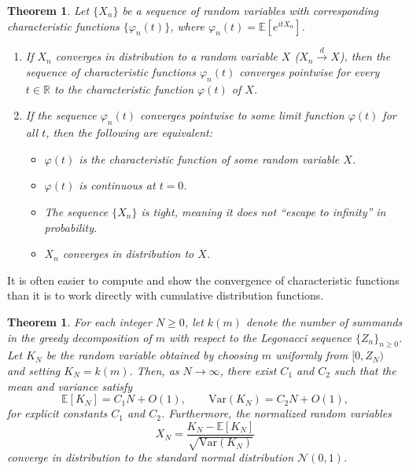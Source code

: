 \documentclass[11pt]{amsart}
\theoremstyle{plain}
\numberwithin{equation}{section} %
\newtheorem{theorem}[thm]{Theorem}
\numberwithin{table}{section} %
\numberwithin{figure}{section}
\begin{document}
	\begin{theorem}
		\label{Levy:theorem}
		Let $\{X_n\}$ be a sequence of random variables with corresponding characteristic functions $\{\varphi_n(t)\}$, where $\varphi_n(t) = \mathbb{E}[e^{itX_n}]$.
		
		\begin{enumerate}
			\item   If $X_n$ converges in distribution to a random variable $X$ ($X_n \xrightarrow{d} X$), then the sequence of characteristic functions $\varphi_n(t)$ converges pointwise for every $t \in \mathbb{R}$ to the characteristic function $\varphi(t)$ of $X$.
			\item   If the sequence $\varphi_n(t)$ converges pointwise to some limit function $\varphi(t)$ for all $t$, then the following are equivalent:
			\begin{itemize}
				\item[(i)] $\varphi(t)$ is the characteristic function of some random variable $X$.
				\item[(ii)] $\varphi(t)$ is continuous at $t = 0$.
				\item[(iii)] The sequence $\{X_n\}$ is tight, meaning it does not ``escape to infinity'' in probability.
				\item[(iv)] $X_n$ converges in distribution to $X$.
			\end{itemize}
		\end{enumerate}
	\end{theorem}
	
	It is often easier to compute and show the convergence of characteristic functions than it is to work directly with cumulative distribution functions.
	
	
	
	
	
	
	
	
	\begin{theorem}
		\label{thm:GaussianGreedy}	
		For each integer $N\ge0$, let $k(m)$ denote the number of summands in the
		greedy decomposition of $m$ with respect to the Legonacci sequence $\{Z_n\}_{n\ge0}$.
		Let $K_N$ be the random variable obtained by choosing $m$ uniformly from
		$[0,Z_N)$ and setting $K_N=k(m)$. Then, as $N\to\infty$, there exist $C_1$ and $C_2$ such that 
		the mean and variance satisfy
		\[
		\mathbb{E}[K_N]=C_1N+O(1), \qquad \mathrm{Var}(K_N)=C_2N+O(1),
		\]
		for explicit constants $C_1$ and $C_2$.
		Furthermore, the normalized random variables
		\[
		X_N=\frac{K_N-\mathbb{E}[K_N]}{\sqrt{\mathrm{Var}(K_N)}}
		\]
		converge in distribution to the standard normal distribution $ \mathcal{N}(0,1)$.
	\end{theorem}
	
\end{document}
